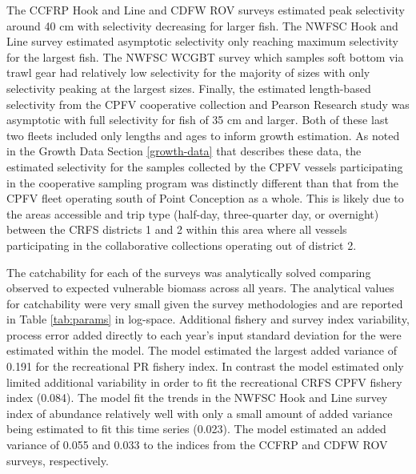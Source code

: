 \documentclass[11pt,
  english,
  letterpaper,
]{article}
\begin{document}
The CCFRP Hook and Line and CDFW ROV surveys estimated peak selectivity around 40 cm with selectivity decreasing for larger fish. The NWFSC Hook and Line survey estimated asymptotic selectivity only reaching maximum selectivity for the largest fish. The NWFSC WCGBT survey which samples soft bottom via trawl gear had relatively low selectivity for the majority of sizes with only selectivity peaking at the largest sizes. Finally, the estimated length-based selectivity from the CPFV cooperative collection and Pearson Research study was asymptotic with full selectivity for fish of 35 cm and larger. Both of these last two fleets included only lengths and ages to inform growth estimation. As noted in the Growth Data Section \ref{growth-data} that describes these data, the estimated selectivity for the samples collected by the CPFV vessels participating in the cooperative sampling program was distinctly different than that from the CPFV fleet operating south of Point Conception as a whole. This is likely due to the areas accessible and trip type (half-day, three-quarter day, or overnight) between the CRFS districts 1 and 2 within this area where all vessels participating in the collaborative collections operating out of district 2.

The catchability for each of the surveys was analytically solved comparing observed to expected vulnerable biomass across all years. The analytical values for catchability were very small given the survey methodologies and are reported in Table \ref{tab:params} in log-space. Additional fishery and survey index variability, process error added directly to each year's input standard deviation for the were estimated within the model. The model estimated the largest added variance of 0.191 for the recreational PR fishery index. In contrast the model estimated only limited additional variability in order to fit the recreational CRFS CPFV fishery index (0.084). The model fit the trends in the NWFSC Hook and Line survey index of abundance relatively well with only a small amount of added variance being estimated to fit this time series (0.023). The model estimated an added variance of 0.055 and 0.033 to the indices from the CCFRP and CDFW ROV surveys, respectively.
\end{document}
